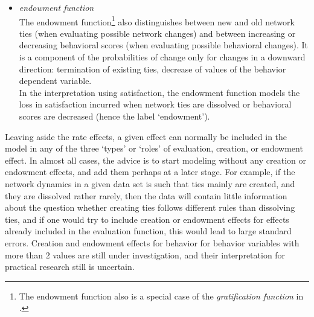 \documentclass[a4paper,fleqn,11pt]{article}
\newcommand{\+}{\, + \,}
\begin{document}
{\begin{itemize}
The creation function\footnote{A special case of the {\it gratification
function} in \citet{Snijders01}.}
distinguishes between new and old network
ties (when evaluating possible network changes) and between
increasing or decreasing behavioral scores (when evaluating
possible behavioral changes).
It is a component of the probabilities of change only for changes in
an upward direction: creation of new ties, augmentation of values
of the behavior dependent variable.\\
In the interpretation using satisfaction, the creation function
models the gain in satisfaction incurred when network ties are created
or behavioral scores are increased.\\
\item {\em endowment function}\\
The endowment function\footnote{The endowment function also is
a special case of the {\it gratification function} in \citet{Snijders01}.}
also distinguishes between new and old network
ties (when evaluating possible network changes) and between
increasing or decreasing behavioral scores (when evaluating
possible behavioral changes).
It is a component of the probabilities of change only for changes in
a downward direction: termination of existing ties, decrease of values
of the behavior dependent variable.\\
In the interpretation using satisfaction, the endowment function
models the loss in satisfaction incurred when network ties are dissolved or
behavioral scores are decreased (hence the label `endowment').
\end{itemize}

Leaving aside the rate effects, a given effect can normally be included
in the model in any of the three `types' or `roles' of
evaluation, creation, or endowment effect.
In almost all cases, the advice is to
start modeling without any creation or endowment effects,
and add them perhaps at a later stage.
For example, if the network dynamics in a given data set is such
that ties mainly are created, and they are dissolved rather rarely,
then the data will contain little information about the question whether
creating ties follows different rules than dissolving ties,
and if one would try to include   creation or endowment effects
for effects already included in the evaluation function,
this would lead to large standard errors.
Creation and endowment effects for behavior for behavior variables with more
than 2 values are still under investigation, and their interpretation
for practical research still is uncertain.

}
\end{document}
